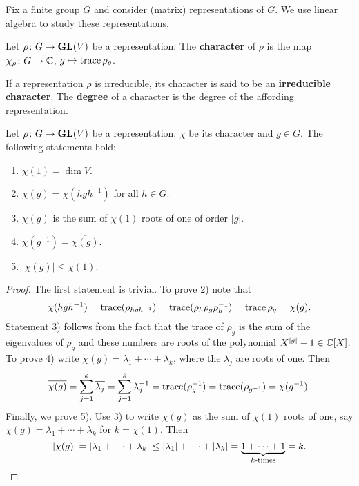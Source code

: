 \chapter{}


Fix a finite group $G$ and consider
(matrix) representations of $G$. We use linear algebra to study 
these representations. 

\begin{definition}
	Let $\rho\colon G\to\mathbf{GL}(V)$ be a representation. The \textbf{character} of $\rho$ 
	is the map $\chi_\rho\colon G\to\mathbb{C}$, $g\mapsto\operatorname{trace}\rho_g$. 	
\end{definition}

If a representation $\rho$ is irreducible, its character is said to be an 
\textbf{irreducible character}. The \textbf{degree} of a character is the degree of the affording
representation. 

\begin{proposition}
	Let $\rho\colon G\to\mathbf{GL}(V)$ be a representation, $\chi$ be its character and $g\in G$.
	The following statements hold:
	\begin{enumerate}
		\item $\chi(1)=\dim V$. 
		\item $\chi(g)=\chi(hgh^{-1})$ for all $h\in G$.
		\item $\chi(g)$ is the sum of $\chi(1)$ roots of one of order $|g|$. 
		\item $\chi(g^{-1})=\overline{\chi(g)}$. 
		\item $|\chi(g)|\leq\chi(1)$.  
	\end{enumerate} 
\end{proposition}

\begin{proof}
	The first statement is trivial. 	To prove 2) note that
	\[
	\chi(hgh^{-1})=\operatorname{trace}(\rho_{hgh^{-1}})=\operatorname{trace}(\rho_h\rho_g\rho_h^{-1})=\operatorname{trace}\rho_g=\chi(g).
	\]
	Statement 3) follows from the fact that the trace of $\rho_g$ is the sum
	of the eigenvalues of $\rho_g$ and these numbers are roots of the polynomial
	$X^{|g|}-1\in\mathbb{C}[X]$. To prove 4) write $\chi(g)=\lambda_1+\cdots+\lambda_k$, where 
	the $\lambda_j$ are roots of one. Then
	\[
	\overline{\chi(g)}=\sum^k_{j=1}\overline{\lambda_j}
	=\sum_{j=1}^k\lambda_j^{-1}
	=\operatorname{trace}(\rho_g^{-1})
	=\operatorname{trace}(\rho_{g^{-1}})
	=\chi(g^{-1}).
	\] 
	Finally, we prove 5). Use 3) to write $\chi(g)$ as the sum of
	$\chi(1)$ roots of one, say $\chi(g)=\lambda_1+\cdots+\lambda_k$ for
	$k=\chi(1)$. Then 
	\[
	|\chi(g)|=|\lambda_1+\cdots+\lambda_k|\leq |\lambda_1|+\cdots+|\lambda_k|
	=\underbrace{1+\cdots+1}_{\text{$k$-times}}=k.\qedhere
	\]
\end{proof}

